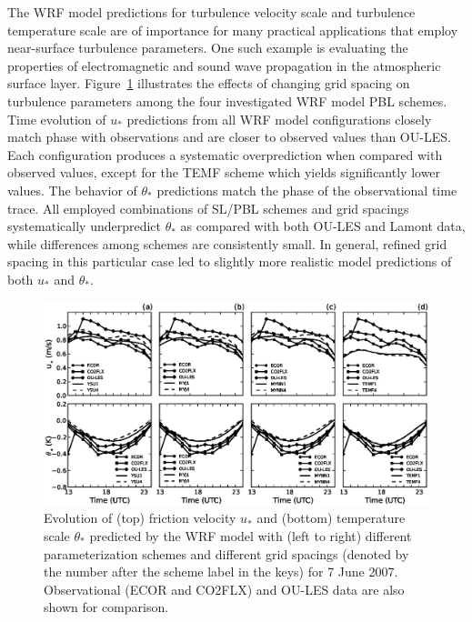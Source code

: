 The WRF model predictions for turbulence velocity scale and turbulence temperature scale are of importance for many practical applications that employ near-surface turbulence parameters. One such example is evaluating the properties of electromagnetic and sound wave propagation in the atmospheric surface layer. Figure~\ref{figure405} illustrates the effects of changing grid spacing on turbulence parameters among the four investigated WRF model PBL schemes. Time evolution of $u_*$ predictions from all WRF model configurations closely match phase with observations and are closer to observed values than OU-LES. Each configuration produces a systematic overprediction when compared with observed values, except for the TEMF scheme which yields significantly lower values. The behavior of $\theta_*$ predictions match the phase of the observational time trace. All employed combinations of SL\slash PBL schemes and grid spacings systematically underpredict $\theta_*$ as compared with both OU-LES and Lamont data, while differences among schemes are consistently small. In general, refined grid spacing in this particular case led to slightly more realistic model predictions of both $u_*$ and $\theta_*$. 


\begin{figure}[ht!]
\begin{center}
\includegraphics[width=\textwidth]{figures/chapter4/ust_tst_grid_20070607}
\end{center}
\caption{Evolution of (top) friction velocity $u_*$ and (bottom) temperature scale $\theta_*$ predicted by the WRF model with (left to right) different parameterization schemes and different grid spacings (denoted by the number after the scheme label in the keys) for 7 June 2007. Observational (ECOR and CO2FLX) and OU-LES data are also shown for comparison.}
\label{figure405}
\end{figure}


